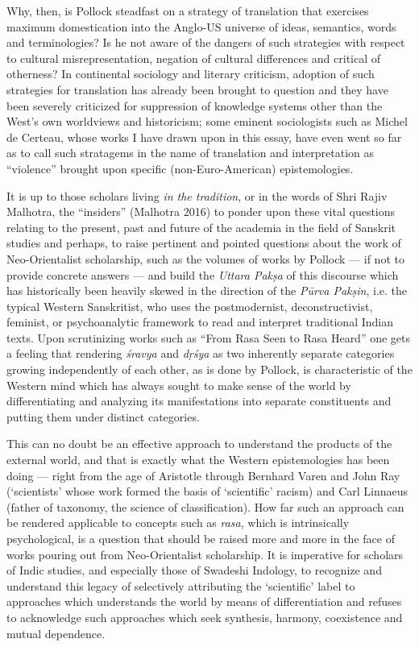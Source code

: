 Why, then, is Pollock steadfast on a strategy of translation that exercises maximum domestication into the Anglo-US universe of ideas, semantics, words and terminologies? Is he not aware of the dangers of such strategies with respect to cultural misrepresentation, negation of cultural differences and critical of otherness? In continental sociology and literary criticism, adoption of such strategies for translation has already been brought to question and they have been severely criticized for suppression of knowledge systems other than the West’s own worldviews and historicism; some eminent sociologists such as Michel de Certeau, whose works I have drawn upon in this essay, have even went so far as to call such stratagems in the name of translation and interpretation as “violence” brought upon specific (non-Euro-American) epistemologies. 

It is up to those scholars living \textsl{in the tradition}, or in the words of Shri Rajiv Malhotra, the “insiders” (Malhotra 2016) to ponder upon these vital questions relating to the present, past and future of the academia in the field of Sanskrit studies and perhaps, to raise pertinent and pointed questions about the work of Neo-Orientalist scholarship, such as the volumes of works by Pollock --- if not to provide concrete answers --- and build the \textsl{Uttara Pakṣa} of this discourse which has historically been heavily skewed in the direction of the \textsl{Pūrva Pakṣin}, i.e. the typical Western Sanskritist, who uses the postmodernist, deconstructivist, feminist, or psychoanalytic framework to read and interpret traditional Indian texts. Upon scrutinizing works such as “From Rasa Seen to Rasa Heard” one gets a feeling that rendering \textsl{śravya} and \textsl{dṛśya} as two inherently separate categories growing independently of each other, as is done by Pollock, is characteristic of the Western mind which has always sought to make sense of the world by differentiating and analyzing its manifestations into separate constituents and putting them under distinct categories. 

This can no doubt be an effective approach to understand the products of the external world, and that is exactly what the Western epistemologies has been doing --- right from the age of Aristotle through Bernhard Varen and John Ray (‘scientists’ whose work formed the basis of ‘scientific’ racism) and Carl Linnaeus (father of taxonomy, the science of classification). How far such an approach can be rendered applicable to concepts such as \textsl{rasa}, which is intrinsically psychological, is a question that should be raised more and more in the face of works pouring out from Neo-Orientalist scholarship. It is imperative for scholars of Indic studies, and especially those of Swadeshi Indology, to recognize and understand this legacy of selectively attributing the ‘scientific’ label to approaches which understands the world by means of differentiation and refuses to acknowledge such approaches which seek synthesis, harmony, coexistence and mutual dependence.

